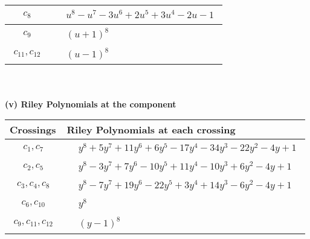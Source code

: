 \documentclass[1p]{elsarticle_modified}
\theoremstyle{definition}
\begin{document}
\begin{tabular}{m{50pt}|m{274pt}}
\hline $$\begin{aligned}c_{8}\end{aligned}$$&$\begin{aligned}
&u^8- u^7-3 u^6+2 u^5+3 u^4-2 u-1
\end{aligned}$\\
\hline $$\begin{aligned}c_{9}\end{aligned}$$&$\begin{aligned}
&(u+1)^8
\end{aligned}$\\
\hline $$\begin{aligned}c_{11},c_{12}\end{aligned}$$&$\begin{aligned}
&(u-1)^8
\end{aligned}$\\
\hline
\end{tabular}\\~\\
\newpage\renewcommand{\arraystretch}{1}
\flushleft \textbf{(v) Riley Polynomials at the component}\newline \\
\begin{tabular}{m{50pt}|m{274pt}}
Crossings & \hspace{64pt}Riley Polynomials at each crossing \\
\hline $$\begin{aligned}c_{1},c_{7}\end{aligned}$$&$\begin{aligned}
&y^8+5 y^7+11 y^6+6 y^5-17 y^4-34 y^3-22 y^2-4 y+1
\end{aligned}$\\
\hline $$\begin{aligned}c_{2},c_{5}\end{aligned}$$&$\begin{aligned}
&y^8-3 y^7+7 y^6-10 y^5+11 y^4-10 y^3+6 y^2-4 y+1
\end{aligned}$\\
\hline $$\begin{aligned}c_{3},c_{4},c_{8}\end{aligned}$$&$\begin{aligned}
&y^8-7 y^7+19 y^6-22 y^5+3 y^4+14 y^3-6 y^2-4 y+1
\end{aligned}$\\
\hline $$\begin{aligned}c_{6},c_{10}\end{aligned}$$&$\begin{aligned}
&y^8
\end{aligned}$\\
\hline $$\begin{aligned}c_{9},c_{11},c_{12}\end{aligned}$$&$\begin{aligned}
&(y-1)^8
\end{aligned}$\\
\hline
\end{tabular}\\~\\
\end{document}

